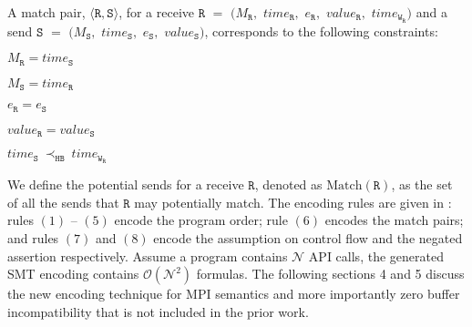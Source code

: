 \begin{definition} \label{def:match}
A match pair, $\langle\mathtt{R}, \mathtt{S}\rangle$, for a receive 
$\mathtt{R}$ $=$ $(M_\mathtt{R},$ $\mathit{time}_\mathtt{R},$ $e_\mathtt{R},$ $\mathit{value}_\mathtt{R},$ $\mathit{time}_{\mathtt{W}_\mathtt{R}})$ and a send $\mathtt{S}$ $=$ $(M_\mathtt{S},$ $\mathit{time}_\mathtt{S},$ $e_\mathtt{S},$ $\mathit{value}_\mathtt{S})$, corresponds to the following constraints:
\begin{compactenum}
\item $M_{\mathtt{R}} = \mathit{time}_{\mathtt{S}}$
\item $M_{\mathtt{S}} = \mathit{time}_{\mathtt{R}}$
\item $e_{\mathtt{R}} = e_{\mathtt{S}}$
\item $\mathit{value}_{\mathtt{R}} = \mathit{value}_{\mathtt{S}}$ 
\item $\mathit{time}_{\mathtt{S}}\ \mathrm{\prec_\mathtt{HB}}\ \mathit{time}_{\mathtt{W}_\mathtt{R}}$
\end{compactenum}
\end{definition}

We define the potential sends for a receive $\mathtt{R}$, denoted as $\mathrm{Match}(\mathtt{R})$, as the set of all the sends that $\mathtt{R}$ may potentially match. The encoding rules are given in : rules $(1)$ -- $(5)$ encode the program order; rule $(6)$ encodes the match pairs; and rules $(7)$ and $(8)$ encode the assumption on control flow and the negated assertion respectively. Assume a program contains $\mathcal{N}$ API calls, the generated SMT encoding contains $\mathcal{O}(\mathcal{N}^2)$ formulas. The following sections 4 and 5 discuss the new encoding technique for MPI semantics and more importantly zero buffer incompatibility that is not included in the prior work.  

\encodingptp